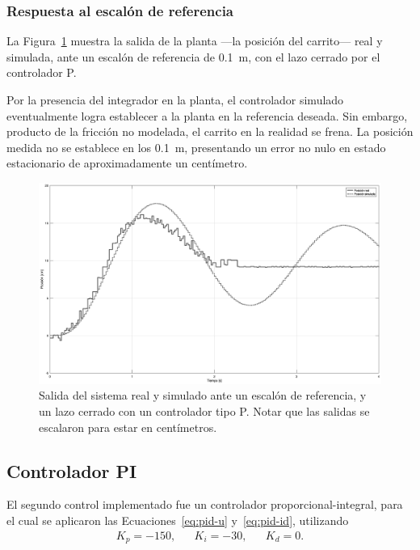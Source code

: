 \subsubsection{Respuesta al escalón de referencia}

La Figura~\ref{fig:p-ref-salida} muestra la salida de la planta ---la posición del carrito--- real y simulada, ante un escalón de referencia de \qty{0.1}{\m}, con el lazo cerrado por el controlador P.

Por la presencia del integrador en la planta, el controlador simulado eventualmente logra establecer a la planta en la referencia deseada. Sin embargo, producto de la fricción no modelada, el carrito en la realidad se frena. La posición medida no se establece en los \qty{0.1}{\m}, presentando un error no nulo en estado estacionario de aproximadamente un centímetro.

\begin{figure}[!htbp]
    \centering
    \includegraphics[width=\linewidth]{img/p-ref-salida.eps}
    \caption{Salida del sistema real y simulado ante un escalón de referencia, y un lazo cerrado con un controlador tipo P. Notar que las salidas se escalaron para estar en centímetros.}
    \label{fig:p-ref-salida}
\end{figure}

\subsection{Controlador PI}

El segundo control implementado fue un controlador proporcional-integral, para el cual se aplicaron las Ecuaciones~\eqref{eq:pid-u} y~\eqref{eq:pid-id}, utilizando
\begin{align*}
    K_p = -150, && K_i = -30, && K_d = 0.
\end{align*}

